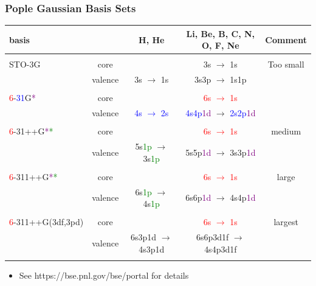 \documentclass[handout]{beamer} %
\begin{document}
\begin{frame}
\frametitle{Pople Gaussian Basis Sets}
\scriptsize{
\begin{table}
\begin{tabular}{lcccc}
\hline \hline 
basis &  & H, He & Li, Be, B, C, N, O, F, Ne & Comment \\
\hline \\
STO-3G & core & &  3s $\rightarrow$ 1s & Too small   \\
    & valence & 3s $\rightarrow$ 1s & 3s3p $\rightarrow$ 1s1p &   \\  \\
\textcolor{red}{6}-\textcolor{blue}{31}G\textcolor{purple}{*} & core &  &   \textcolor{red}{6s  $\rightarrow$ 1s } & \\  
  & valence & \textcolor{blue}{4s  $\rightarrow$ 2s} & \textcolor{blue}{4s4p}\textcolor{purple}{1d}  $\rightarrow$ \textcolor{blue}{2s2p}\textcolor{purple}{1d} & \\  \\
\textcolor{red}{6}-31++G\textcolor{purple}{*}\textcolor{green}{*} & core & & \textcolor{red}{6s  $\rightarrow$ 1s} &  medium \\  
  & valence & 5s\textcolor{green}{1p}  $\rightarrow$ 3s\textcolor{green}{1p} & 5s5p\textcolor{purple}{1d}  $\rightarrow$ 3s3p\textcolor{purple}{1d} \\ \\
\textcolor{red}{6}-311++G\textcolor{purple}{*}\textcolor{green}{*} & core & & \textcolor{red}{6s  $\rightarrow$ 1s} &  large \\  
  & valence & 6s\textcolor{green}{1p}  $\rightarrow$ 4s\textcolor{green}{1p} & 6s6p\textcolor{purple}{1d}  $\rightarrow$ 4s4p\textcolor{purple}{1d} \\  \\
  \textcolor{red}{6}-311++G(3df,3pd) & core & & \textcolor{red}{6s  $\rightarrow$ 1s} &  largest \\
  & valence & 6s3p1d  $\rightarrow$ 4s3p1d & 6s6p3d1f $\rightarrow$ 4s4p3d1f \\ \\

\hline \hline
\end{tabular}
\end{table}
}
\begin{itemize}
\item See https://bse.pnl.gov/bse/portal for details
\end{itemize}

\end{frame}
\end{document}
